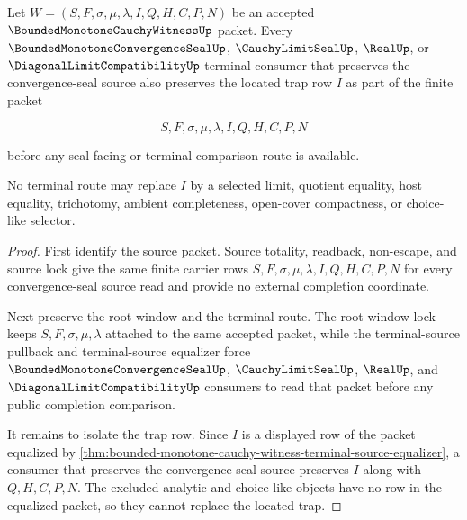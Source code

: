 \begin{theorem}
\label{thm:bounded-monotone-cauchy-witness-terminal-located-trap-preservation}
Let $W=(S,F,\sigma,\mu,\lambda,I,Q,H,C,P,N)$ be an accepted $\BoundedMonotoneCauchyWitnessUp$ packet. Every $\BoundedMonotoneConvergenceSealUp$, $\CauchyLimitSealUp$, $\RealUp$, or $\DiagonalLimitCompatibilityUp$ terminal consumer that preserves the convergence-seal source also preserves the located trap row $I$ as part of the finite packet

$$
S,F,\sigma,\mu,\lambda,I,Q,H,C,P,N
$$

before any seal-facing or terminal comparison route is available.

No terminal route may replace $I$ by a selected limit, quotient equality, host equality, trichotomy, ambient completeness, open-cover compactness, or choice-like selector.
\end{theorem}
\begin{proof}
First identify the source packet. Source totality, readback, non-escape, and source lock give the same finite carrier rows $S,F,\sigma,\mu,\lambda,I,Q,H,C,P,N$ for every convergence-seal source read and provide no external completion coordinate.

Next preserve the root window and the terminal route. The root-window lock keeps $S,F,\sigma,\mu,\lambda$ attached to the same accepted packet, while the terminal-source pullback and terminal-source equalizer force $\BoundedMonotoneConvergenceSealUp$, $\CauchyLimitSealUp$, $\RealUp$, and $\DiagonalLimitCompatibilityUp$ consumers to read that packet before any public completion comparison.

It remains to isolate the trap row. Since $I$ is a displayed row of the packet equalized by \autoref{thm:bounded-monotone-cauchy-witness-terminal-source-equalizer}, a consumer that preserves the convergence-seal source preserves $I$ along with $Q,H,C,P,N$. The excluded analytic and choice-like objects have no row in the equalized packet, so they cannot replace the located trap.
\end{proof}

